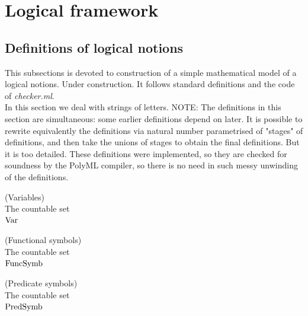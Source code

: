 \def\topic{}

\section{Logical framework}


\subsection{Definitions of logical notions}%

This subsections is devoted to construction of a simple mathematical model of a logical notions. Under construction. It follows standard definitions and the code of \textit{checker.ml}.\\

In this section we deal with strings of letters.
NOTE: The definitions in this section are simultaneous: some earlier definitions depend on later. It is possible to rewrite equivalently the definitions via natural number parametrised of "stages" of definitions, and then take the unions of stages to obtain the final definitions. But it is too detailed. These definitions were implemented, so they are checked for soundness by the PolyML compiler, so there is no need in such messy unwinding of the definitions.



\begin{definition}(Variables)\\
The countable set \\
$\mathrm{Var}$
\end{definition}

\begin{definition}(Functional symbols)\\
The countable set \\
$\mathrm{FuncSymb}$
\end{definition}

\begin{definition}(Predicate symbols)\\
The countable set \\
$\mathrm{PredSymb}$
\end{definition}

